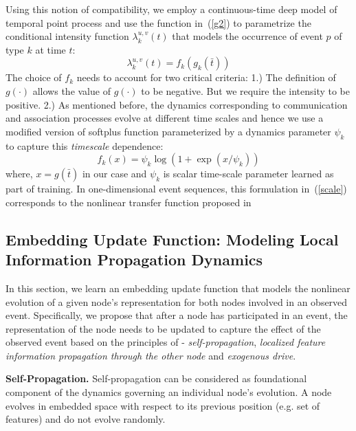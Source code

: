 \documentclass[11pt]{article}
\begin{document}
Using this notion of compatibility, we employ a continuous-time deep model of temporal point process and use the function in~(\ref{g2}) to parametrize the conditional intensity function $\lambda_k^{u,v}(t)$ that models the occurrence of event $p$ of type $k$ at time $t$:
\begin{equation}\label{intensity}
\lambda_k^{u,v}(t) = f_k(g_k(\bar{t}))
\end{equation}
The choice of $f_k$ needs to account for two critical criteria: 1.) The definition of $g(\cdot)$ allows the value of $g(\cdot)$ to be negative. But we require the intensity to be positive. 2.) As mentioned before, the dynamics corresponding to communication and association processes evolve at different time scales and hence we use a modified version of softplus function parameterized by a dynamics parameter $\psi_k$ to capture this \textit{timescale} dependence:
\begin{equation}\label{scale}
f_k(x) = \psi_k \log(1 + \exp(x/\psi_k))
\end{equation}
where, $x = g(\bar{t})$ in our case and $\psi_k$ is scalar time-scale parameter learned as part of training. In one-dimensional event sequences, this formulation in~(\ref{scale}) corresponds to the nonlinear transfer function proposed in~\cite{MeiEis17}

\vspace{-2mm}
\subsection{Embedding Update Function: Modeling Local Information Propagation Dynamics}
\vspace{-1mm}

In this section, we learn an embedding update function that models the nonlinear evolution of a given node's representation for both nodes involved in an observed event. Specifically, we propose that after a node has participated in an event, the representation of the node needs to be updated to capture the effect of the observed event based on the principles of - \emph{self-propagation}, \emph{localized feature information propagation through the other node} and \emph{exogenous drive}.

{\bf Self-Propagation.} Self-propagation can be considered as foundational component of the dynamics governing an individual node's evolution. A node evolves in embedded space with respect to its previous position (e.g. set of features) and do not evolve randomly. 
\end{document}
